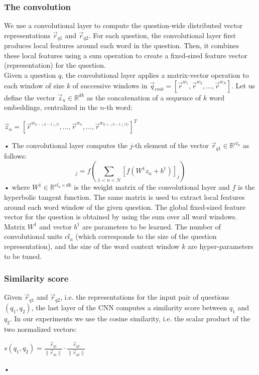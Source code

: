 \documentclass[10pt,twocolumn,letterpaper]{article}
\begin{document}
\subsubsection{The convolution}
We use a convolutional layer to compute the question-wide distributed vector representations $\vec{r}_{q1}$ and $\vec{r}_{q2}$. For each question, the convolutional layer first produces local features around each word in the question. Then, it combines these local features using a sum operation to create a fixed-sized feature vector (representation) for the question.\\
Given a question $q$, the convolutional layer applies a matrix-vector operation to each window of size $k$ of successive windows in $\vec{q}_{emb} = [\vec{r}^{w_1},\vec{r}^{w_2}, ..., \vec{r}^{w_N}]$. Let us define the vector $\vec{z}_n \in \mathbb{R}^{dk}$ as the concatenation of a sequence of $k$ word embeddings, centralized in the $n$-th word:
\begin{center}
$\vec{z}_n = [\vec{r}^{w_{n-(k-1)/2}},..., \vec{r}^{w_n}, ...,\vec{r}^{w_{n+(k-1)/2)}}]^T$
\end{center}•
The convolutional layer computes the $j$-th element of the vector $\vec{r}_{q1} \in \mathbb{R}^{cl_u}$ as follows: 
\begin{equation}
[\vec{r}_{q1}]_j = f \left( \sum_{1<n<N}[f(W^1 z_n + b^1)]_j \right)
\label{eq:conv}
\end{equation}•
where $W^1 \in \mathbb{R}^{cl_u \times dk}$ is the weight matrix of the convolutional layer and $f$ is the hyperbolic tangent function. The same matrix is used to extract local features around each word window of the given question. The global fixed-sized feature vector for the question is obtained by using the sum over all word windows.\\
Matrix $W^1$ and vector $b^1$ are parameters to be learned. The number of convolutional units $cl_u$ (which corresponds to the size of the question representation), and the size of the word context window $k$ are hyper-parameters to be tuned. 

\subsubsection{Similarity score}
Given $\vec{r}_{q1}$ and $\vec{r}_{q2}$, i.e. the representations for the input pair of questions $(q_1, q_2)$, the last layer of the CNN computes a similarity score between $q_1$ and $q_2$. In our experiments we use the cosine similarity, i.e. the scalar product of the two normalized vectors:
\begin{center}
$s(q_1, q_2) = \frac{\vec{r}_{q1}}{\lVert \vec{r}_{q1} \rVert} \cdot \frac{\vec{r}_{q2}}{\lVert \vec{r}_{q2} \rVert}$
\end{center}•
\end{document}

